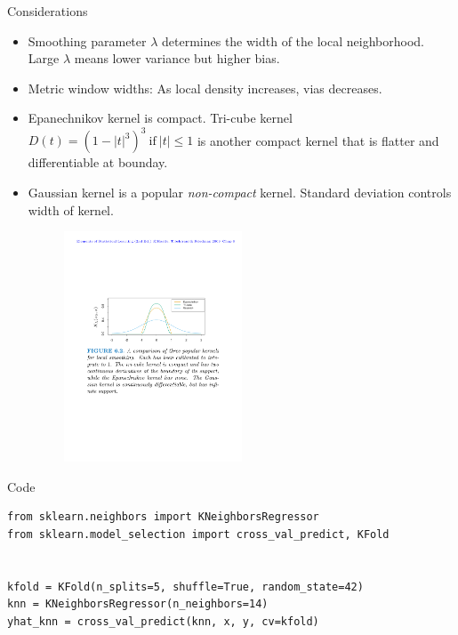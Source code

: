 \documentclass[aspectratio=169]{beamer}
\begin{document}
\begin{frame}{Considerations}
    \begin{itemize}
        \item Smoothing parameter $\lambda$ determines the width of the local neighborhood. Large $\lambda$ means lower variance but higher bias.
        \item Metric window widths: As local density increases, vias decreases.
        \item Epanechnikov kernel is compact. Tri-cube kernel $D(t) = (1-|t|^3)^3\mathrm{~if~}|t| \leq 1$ is another compact kernel that is flatter and differentiable at bounday.
        \item Gaussian kernel is a popular \textit{non-compact} kernel. Standard deviation controls width of kernel.
        \begin{figure}
            \centering
            \includegraphics[width=0.5\textwidth]{figures/kerneltypes.pdf}
        \end{figure}
    \end{itemize}
\end{frame}


\begin{frame}[fragile]{Code}
\begin{verbatim}
from sklearn.neighbors import KNeighborsRegressor
from sklearn.model_selection import cross_val_predict, KFold


kfold = KFold(n_splits=5, shuffle=True, random_state=42)
knn = KNeighborsRegressor(n_neighbors=14)
yhat_knn = cross_val_predict(knn, x, y, cv=kfold)
\end{verbatim}
\end{frame}
\end{document}
